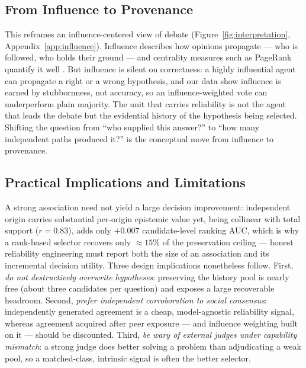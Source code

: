 \subsection{From Influence to Provenance}
\label{subsec:influence_to_provenance}
This reframes an influence-centered view of debate (Figure~\ref{fig:interpretation},
Appendix~\ref{app:influence}). Influence describes
how opinions propagate --- who is followed, who holds their ground --- and centrality measures such as
PageRank quantify it well \cite{page1998pagerank,zhang2024collaboration}. But influence is silent on
correctness: a highly influential agent can propagate a right or a wrong hypothesis, and our data show
influence is earned by stubbornness, not accuracy, so an influence-weighted vote can underperform plain
majority. The unit that carries reliability is not the agent that leads the debate but the evidential
history of the hypothesis being selected. Shifting the question from ``who supplied this answer?'' to ``how
many independent paths produced it?'' is the conceptual move from influence to provenance.

\subsection{Practical Implications and Limitations}
\label{subsec:limitations_future}
A strong association need not yield a large decision improvement: independent origin carries substantial
per-origin epistemic value yet, being collinear with total support ($r=0.83$), adds only $+0.007$
candidate-level ranking AUC, which is why a rank-based selector recovers only $\approx 15\%$ of the
preservation ceiling --- honest reliability engineering must report both the size of an association and its
incremental decision utility. Three design implications nonetheless follow. First, \emph{do not destructively
overwrite hypotheses}: preserving the history pool is nearly free (about three candidates per question) and
exposes a large recoverable headroom. Second, \emph{prefer independent corroboration to social consensus}:
independently generated agreement is a cheap, model-agnostic reliability signal, whereas agreement acquired
after peer exposure --- and influence weighting built on it --- should be discounted. Third, \emph{be wary of
external judges under capability mismatch}: a strong judge does better solving a problem than adjudicating a
weak pool, so a matched-class, intrinsic signal is often the better selector.

